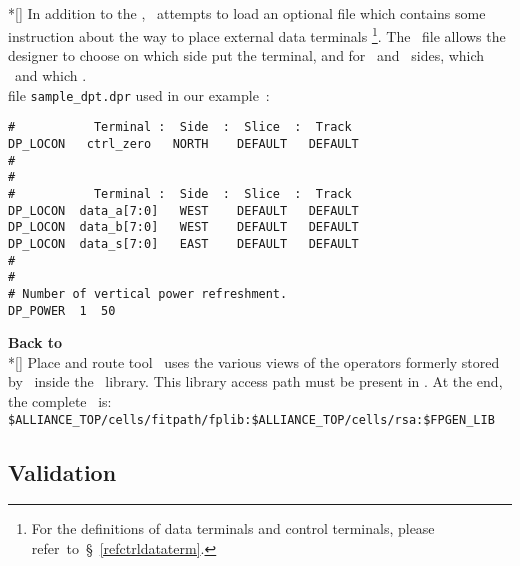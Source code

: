    \\*[\bigskipamount]
   \nopagebreak
   \indent
     In addition to the \netlist, \dpr\ attempts to load an optional file
   which contains some instruction about the way to place external data
   terminals
   \footnote{
      For the definitions of data terminals and control terminals, please
      refer~to~\S~\ref{refctrldataterm}.
   }. The \dprfile\ file allows the designer to choose on which side put
   the terminal, and for \EAST\ and \WEST\ sides, which \slice\ and which
   \track.\\
   \nopagebreak
   \indent
     file {\tt sample\_dpt.dpr} used in our example~:\\
   \begin{minipage}[t]{\textwidth}
   \begin{verbatim}
#           Terminal :  Side  :  Slice  :  Track
DP_LOCON   ctrl_zero   NORTH    DEFAULT   DEFAULT
#
#
#           Terminal :  Side  :  Slice  :  Track
DP_LOCON  data_a[7:0]   WEST    DEFAULT   DEFAULT
DP_LOCON  data_b[7:0]   WEST    DEFAULT   DEFAULT
DP_LOCON  data_s[7:0]   EAST    DEFAULT   DEFAULT
#
#
# Number of vertical power refreshment.
DP_POWER  1  50
   \end{verbatim}
   \end{minipage}
   {\bf Back to \mbkcatalib}
   \\*[\bigskipamount]
   \nopagebreak
   \indent
     Place and route tool \dpr\ uses the various views of the operators
   formerly stored by \fpgen\ inside the \fpgenlib\ library. This library
   access path must be present in \mbkcatalib.
   \nopagebreak
   \indent
     At the end, the complete \mbkcatalib\ is:\\
   \doubleindent
   \nopagebreak
       {\tt \$ALLIANCE\_TOP/cells/fitpath/fplib:\$ALLIANCE\_TOP/cells/rsa:\$FPGEN\_LIB}
   \subsection{Validation}
